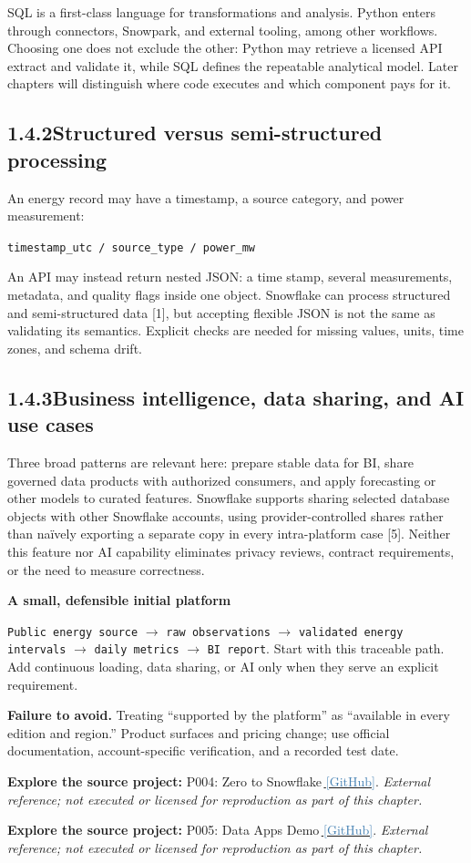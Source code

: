 \documentclass[11pt,twoside]{article}
\newcommand{\topic}[2]{\subsection*{#1\quad #2}}
\newcommand{\repo}[2]{\par\begingroup\small\sffamily\color{inkgray}\textbf{Explore the source project:} #1\,\href{#2}{\,\textcolor{steelblue}{[GitHub]}}. \textit{External reference; not executed or licensed for reproduction as part of this chapter.}\par\endgroup}
\begin{document}
SQL is a first-class language for transformations and analysis. Python enters through connectors, Snowpark, and external tooling, among other workflows. Choosing one does not exclude the other: Python may retrieve a licensed API extract and validate it, while SQL defines the repeatable analytical model. Later chapters will distinguish where code executes and which component pays for it.

\topic{1.4.2}{Structured versus semi-structured processing}
An energy record may have a timestamp, a source category, and power measurement:\par\smallskip\centerline{\texttt{timestamp\_utc / source\_type / power\_mw}}\smallskip\noindent An API may instead return nested JSON: a time stamp, several measurements, metadata, and quality flags inside one object. Snowflake can process structured and semi-structured data [1], but accepting flexible JSON is not the same as validating its semantics. Explicit checks are needed for missing values, units, time zones, and schema drift.

\topic{1.4.3}{Business intelligence, data sharing, and AI use cases}
Three broad patterns are relevant here: prepare stable data for BI, share governed data products with authorized consumers, and apply forecasting or other models to curated features. Snowflake supports sharing selected database objects with other Snowflake accounts, using provider-controlled shares rather than naïvely exporting a separate copy in every intra-platform case [5]. Neither this feature nor AI capability eliminates privacy reviews, contract requirements, or the need to measure correctness.

\begin{whitebox}
\textbf{A small, defensible initial platform}\par
\texttt{Public energy source} \(\rightarrow\) \texttt{raw observations} \(\rightarrow\) \texttt{validated energy intervals} \(\rightarrow\) \texttt{daily metrics} \(\rightarrow\) \texttt{BI report}. Start with this traceable path. Add continuous loading, data sharing, or AI only when they serve an explicit requirement.
\end{whitebox}

\textbf{Failure to avoid.} Treating ``supported by the platform'' as ``available in every edition and region.'' Product surfaces and pricing change; use official documentation, account-specific verification, and a recorded test date.
\repo{P004: Zero to Snowflake}{https://github.com/Snowflake-Labs/sfguide-getting-started-from-zero-to-snowflake}
\repo{P005: Data Apps Demo}{https://github.com/Snowflake-Labs/sfguide-data-apps-demo}
\end{document}
